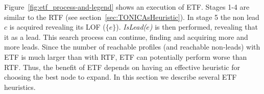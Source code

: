 \documentclass[prodmode,acmtecs]{acmsmall} %
\newcommand{\islead}[1]{{\em IsLead(#1)}}
\begin{document}
Figure~\ref{fig:etf_process-and-legend} shows an execution of ETF. Stages 1-4 are similar to the RTF (see section~\ref{sec:TONICAsHeuristic}). In stage 5 the non lead $c$ is acquired revealing its LOF ($\{e\}$). \islead{$e$} is then performed, revealing that it as a lead. This search process can continue, finding and acquiring more and more leads.
%
%
%
%
%
%
%
Since the number of reachable profiles (and reachable non-leads) with ETF is much larger than with RTF, ETF can potentially perform worse than RTF. Thus, the benefit of ETF depends on having an effective heuristic for choosing the best node to expand. In this section we describe several ETF heuristics.
\end{document}
